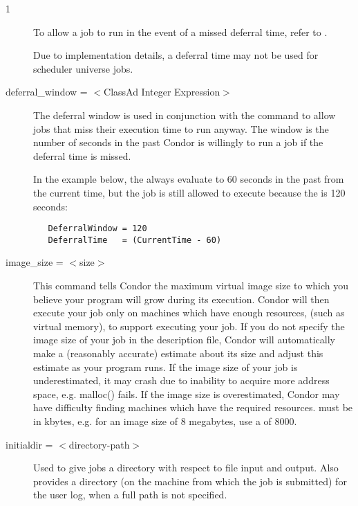 \begin{ManPage}{\label{man-condor-submit}}{1}
\begin{description}
To allow a job to run in the event of a missed deferral time,
refer to .

Due to implementation details,
a deferral time may not be used for scheduler universe jobs.


\item[deferral\_window = $<$ClassAd Integer Expression$>$]
The deferral window is used in conjunction with the
 command to allow jobs that
miss their execution time to run anyway. The window is
the number of seconds in the past Condor is willingly
to run a job if the deferral time is missed.

In the example below, the  always
evaluate to 60 seconds in the past from the current time, but
the job is still allowed to execute because the 
 is 120 seconds:

\begin{verbatim} 
   DeferralWindow = 120
   DeferralTime   = (CurrentTime - 60)
\end{verbatim}



\item[image\_size = $<$size$>$] This command tells Condor the maximum
virtual image size to which you believe your program will grow during
its execution. Condor will then execute your job only on machines which
have enough resources, (such as virtual memory), to support executing
your job. If you do not specify the image size of your job in the
description file, Condor will automatically make a (reasonably accurate)
estimate about its size and adjust this estimate as your program runs.
If the image size of your job is underestimated, it may crash due to
inability to acquire more address space, e.g. malloc() fails. If the image
size is overestimated, Condor may have difficulty finding machines which
have the required resources.  must be in kbytes, e.g. for
an image size of 8 megabytes, use a  of 8000.


\item[initialdir = $<$directory-path$>$] 
Used to give jobs a directory with respect to file input and output.
Also provides a directory 
(on the machine from which the job is submitted)
for the user log, when a full path is not specified. 


\end{description}
\end{ManPage}
